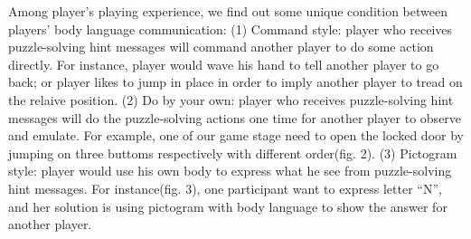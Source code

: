 \documentclass{chi-ext}
\begin{document}
Among player's playing experience, we find out some unique condition between players' body language communication: 
(1) Command style: player who receives puzzle-solving hint messages will command another player to do some action directly. For instance, player would wave his hand to tell another player to go back; or player likes to jump in place in order to imply another player to tread on the relaive position.
(2) Do by your own: player who receives puzzle-solving hint messages will do the puzzle-solving actions one time for another player to observe and emulate. For example, one of our game stage need to open the locked door by jumping on three buttoms respectively with different order(fig. 2).
(3) Pictogram style: player would use his own body to express what he see from puzzle-solving hint messages. For instance(fig. 3), one participant want to express letter ``N'', and her solution is using pictogram with body language to show the answer for another player.

\end{document}
